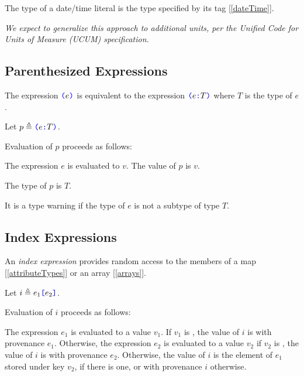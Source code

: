 \documentclass{article}
\begin{document}

The type of a date/time literal is the type specified by its tag [\ref{dateTime}].


{\em We expect to generalize this approach to additional units, per the Unified Code for Units of Measure (UCUM) specification.}



\subsection{Parenthesized Expressions}
\label{parenthesizedExpressions}

\ParenthesizedExpression{}


The expression  $\texttt{\color{blue} (}{}e \texttt{\color{blue} )}{}$ is equivalent to the expression $\texttt{\color{blue} (}{}e \texttt{\color{blue} :}{} T \texttt{\color{blue} )}{}$ where $T$ is the type of $e$.

Let $p \triangleq \texttt{\color{blue} (}{}e \texttt{\color{blue} :}{} T \texttt{\color{blue} )}{}$.

Evaluation of $p$ proceeds as follows:

The expression $e$ is evaluated to $v$. The value of $p$ is $v$.

The type of $p$ is $T$.

It is a type warning if the type of  $e$ is not a subtype of type $T$. 

\subsection{Index Expressions}
\label{indexExpressions}

An {\em index expression} provides random access to the members of a map  [\ref{attributeTypes}] or an array [\ref{arrays}].

\IndexExpression{}

Let $i \triangleq e_1\texttt{\color{blue} [}{}e_2\texttt{\color{blue} ]}{}$.

Evaluation of $i$ proceeds as follows:

The expression  $e_1$ is evaluated to a value $v_1$.  If $v_1$ is \NULL{}, the value of $i$ is \NULL{} with provenance $e_1$. 
Otherwise,  the expression $e_2$ is evaluated to a value $v_2$
 if $v_2$  is \NULL{}, the value of $i$ is \NULL{} with provenance $e_2$.
Otherwise, the value of $i$ is the element of $e_1$ stored under key $v_2$, if there is one, or \NULL{} with provenance $i$ otherwise.
\end{document}
